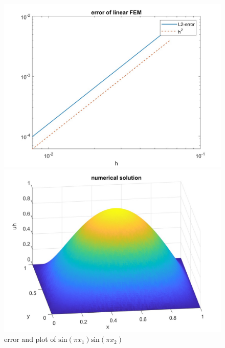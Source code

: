 \documentclass{article}
\begin{document}
\begin{figure}[!h]
	\begin{minipage}[c]{0.5\linewidth}
		\includegraphics[width=\linewidth]{E2error.jpg}
	\end{minipage}
	\begin{minipage}[c]{0.5\linewidth}
		\includegraphics[width=\linewidth]{E2NumSol.jpg}
	\end{minipage}
	\caption{error and plot of $\text{sin}(\pi x_1)\text{sin}(\pi x_2)$}
	\label{fig:E2}
\end{figure}
\end{document}
